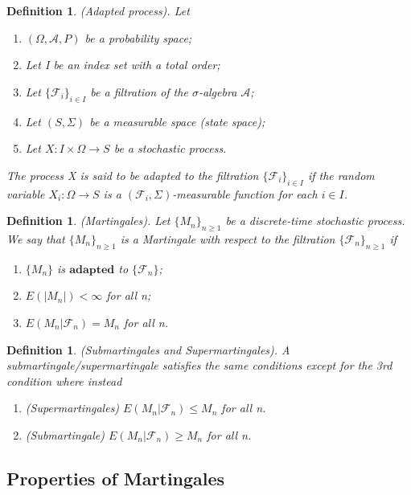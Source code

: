 \documentclass[twoside]{article}
\newtheorem{definition}[theorem]{Definition}
\begin{document}
\begin{definition}(Adapted process). Let 
\begin{enumerate}
\item $(\Omega, \mathcal{A}, P)$ be a probability space;
\item Let I be an index set with a total order;
\item Let $\{\mathcal{F}_i\}_{i \in I}$ be a filtration of the $\sigma$-algebra $\mathcal{A}$;
\item Let $(S, \Sigma)$ be a measurable space (state space);
\item Let $X: I \times \Omega \rightarrow S$ be a stochastic process.
\end{enumerate}

The process X is said to be adapted to the filtration $\{\mathcal{F}_i\}_{i \in I}$ if the random variable $X_i: \Omega \rightarrow S$ is a $(\mathcal{F}_i, \Sigma)$-measurable function for each $i \in I$.
\end{definition}

\begin{definition}(Martingales). Let $\{M_n\}_{n \geq 1}$ be a discrete-time stochastic process. We say that $\{M_n\}_{n \geq 1}$ is a Martingale with respect to the filtration $\{\mathcal{F}_n\}_{n \geq 1}$ if
\begin{enumerate}
\item $\{M_n\}$ is $\textbf{adapted}$ to $\{\mathcal{F}_n\}$;
\item $E(|M_n|) < \infty$ for all n;
\item $E(M_n|\mathcal{F}_n) = M_n$ for all n.
\end{enumerate}
\end{definition}

\begin{definition}(Submartingales and Supermartingales). A submartingale/supermartingale satisfies the same conditions except for the 3rd condition where instead
\begin{enumerate}
\item (Supermartingales) $E(M_n|\mathcal{F}_n) \leq M_n$ for all n.
\item (Submartingale) $E(M_n|\mathcal{F}_n) \geq M_n$ for all n.
\end{enumerate}
\end{definition}

\subsection{Properties of Martingales}
\end{document}
